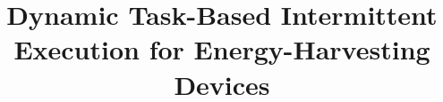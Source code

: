 \documentclass[pageno]{jpaper}
\newcommand{\sysfull}{Dynamic Task-Based Intermittent Execution for Energy-Harvesting Devices}
\begin{document}
\title{\sysfull}         %
\date{}
\maketitle
%
%
%
%
%
%
%
%
%
%
\end{document}
